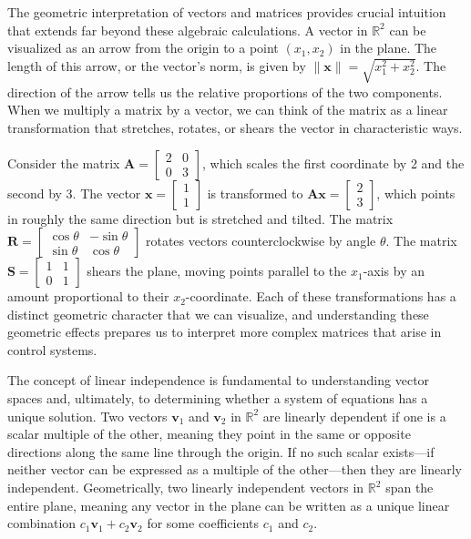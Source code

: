 The geometric interpretation of vectors and matrices provides crucial intuition that extends far beyond these algebraic calculations. A vector in $\mathbb{R}^2$ can be visualized as an arrow from the origin to a point $(x_1, x_2)$ in the plane. The length of this arrow, or the vector's norm, is given by $\|\mathbf{x}\| = \sqrt{x_1^2 + x_2^2}$. The direction of the arrow tells us the relative proportions of the two components. When we multiply a matrix by a vector, we can think of the matrix as a linear transformation that stretches, rotates, or shears the vector in characteristic ways.

Consider the matrix $\mathbf{A} = \begin{bmatrix} 2 & 0 \\ 0 & 3 \end{bmatrix}$, which scales the first coordinate by 2 and the second by 3. The vector $\mathbf{x} = \begin{bmatrix} 1 \\ 1 \end{bmatrix}$ is transformed to $\mathbf{A}\mathbf{x} = \begin{bmatrix} 2 \\ 3 \end{bmatrix}$, which points in roughly the same direction but is stretched and tilted. The matrix $\mathbf{R} = \begin{bmatrix} \cos\theta & -\sin\theta \\ \sin\theta & \cos\theta \end{bmatrix}$ rotates vectors counterclockwise by angle $\theta$. The matrix $\mathbf{S} = \begin{bmatrix} 1 & 1 \\ 0 & 1 \end{bmatrix}$ shears the plane, moving points parallel to the $x_1$-axis by an amount proportional to their $x_2$-coordinate. Each of these transformations has a distinct geometric character that we can visualize, and understanding these geometric effects prepares us to interpret more complex matrices that arise in control systems.

The concept of linear independence is fundamental to understanding vector spaces and, ultimately, to determining whether a system of equations has a unique solution. Two vectors $\mathbf{v}_1$ and $\mathbf{v}_2$ in $\mathbb{R}^2$ are linearly dependent if one is a scalar multiple of the other, meaning they point in the same or opposite directions along the same line through the origin. If no such scalar exists---if neither vector can be expressed as a multiple of the other---then they are linearly independent. Geometrically, two linearly independent vectors in $\mathbb{R}^2$ span the entire plane, meaning any vector in the plane can be written as a unique linear combination $c_1\mathbf{v}_1 + c_2\mathbf{v}_2$ for some coefficients $c_1$ and $c_2$.

